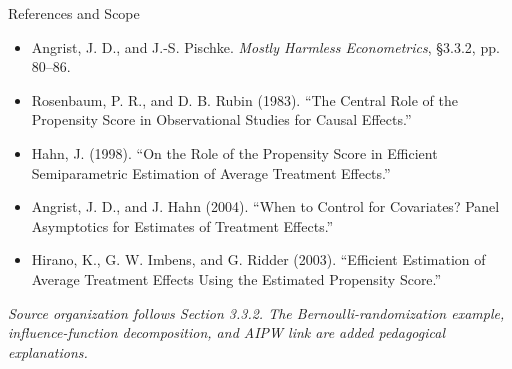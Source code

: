 \documentclass[aspectratio=169,11pt]{beamer}
\begin{document}
\begin{frame}{References and Scope}
\small
\begin{itemize}
\item Angrist, J. D., and J.-S. Pischke. \emph{Mostly Harmless Econometrics}, \S3.3.2, pp. 80--86.
\item Rosenbaum, P. R., and D. B. Rubin (1983). ``The Central Role of the Propensity Score in Observational Studies for Causal Effects.''
\item Hahn, J. (1998). ``On the Role of the Propensity Score in Efficient Semiparametric Estimation of Average Treatment Effects.''
\item Angrist, J. D., and J. Hahn (2004). ``When to Control for Covariates? Panel Asymptotics for Estimates of Treatment Effects.''
\item Hirano, K., G. W. Imbens, and G. Ridder (2003). ``Efficient Estimation of Average Treatment Effects Using the Estimated Propensity Score.''
\end{itemize}
\medskip
\textit{Source organization follows Section 3.3.2. The Bernoulli-randomization example, influence-function decomposition, and AIPW link are added pedagogical explanations.}
\end{frame}
\end{document}
